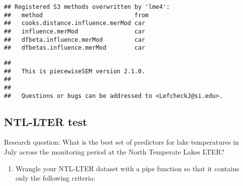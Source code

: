 \documentclass[]{article}
\newenvironment{Shaded}{\begin{snugshade}}{\end{snugshade}}
\newcommand{\CommentTok}[1]{\textcolor[rgb]{0.56,0.35,0.01}{\textit{#1}}}
\newcommand{\DataTypeTok}[1]{\textcolor[rgb]{0.13,0.29,0.53}{#1}}
\newcommand{\DecValTok}[1]{\textcolor[rgb]{0.00,0.00,0.81}{#1}}
\newcommand{\KeywordTok}[1]{\textcolor[rgb]{0.13,0.29,0.53}{\textbf{#1}}}
\newcommand{\NormalTok}[1]{#1}
\newcommand{\OperatorTok}[1]{\textcolor[rgb]{0.81,0.36,0.00}{\textbf{#1}}}
\newcommand{\StringTok}[1]{\textcolor[rgb]{0.31,0.60,0.02}{#1}}
\providecommand{\tightlist}{%
  \setlength{\itemsep}{0pt}\setlength{\parskip}{0pt}}
\begin{document}
\begin{verbatim}
## Registered S3 methods overwritten by 'lme4':
##   method                          from
##   cooks.distance.influence.merMod car 
##   influence.merMod                car 
##   dfbeta.influence.merMod         car 
##   dfbetas.influence.merMod        car
\end{verbatim}

\begin{verbatim}
## 
##   This is piecewiseSEM version 2.1.0.
## 
## 
##   Questions or bugs can be addressed to <LefcheckJ@si.edu>.
\end{verbatim}

\begin{Shaded}
\end{Shaded}

\hypertarget{ntl-lter-test}{%
\subsection{NTL-LTER test}\label{ntl-lter-test}}

Research question: What is the best set of predictors for lake
temperatures in July across the monitoring period at the North Temperate
Lakes LTER?

\begin{enumerate}
\def\labelenumi{\arabic{enumi}.}
\setcounter{enumi}{2}
\tightlist
\item
  Wrangle your NTL-LTER dataset with a pipe function so that it contains
  only the following criteria:
\end{enumerate}
\end{document}

